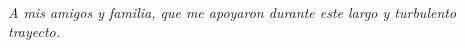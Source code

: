\thispagestyle{empty}
\
\vspace{5cm}

\begin{flushright}
    \textit{A mis amigos y familia, que me apoyaron durante este largo y turbulento trayecto.}
\end{flushright}